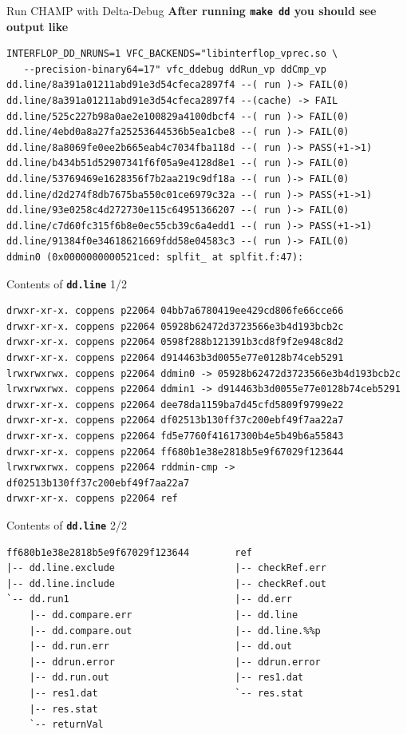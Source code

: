 \documentclass[aspectratio=169]{beamer}
\begin{document}
    \begin{frame}[fragile]{Run CHAMP with Delta-Debug}
    \textbf{After running \texttt{make dd} you should see output like}
      \begin{verbatim}
INTERFLOP_DD_NRUNS=1 VFC_BACKENDS="libinterflop_vprec.so \
   --precision-binary64=17" vfc_ddebug ddRun_vp ddCmp_vp
dd.line/8a391a01211abd91e3d54cfeca2897f4 --( run )-> FAIL(0)
dd.line/8a391a01211abd91e3d54cfeca2897f4 --(cache) -> FAIL
dd.line/525c227b98a0ae2e100829a4100dbcf4 --( run )-> FAIL(0)
dd.line/4ebd0a8a27fa25253644536b5ea1cbe8 --( run )-> FAIL(0)
dd.line/8a8069fe0ee2b665eab4c7034fba118d --( run )-> PASS(+1->1)
dd.line/b434b51d52907341f6f05a9e4128d8e1 --( run )-> FAIL(0)
dd.line/53769469e1628356f7b2aa219c9df18a --( run )-> FAIL(0)
dd.line/d2d274f8db7675ba550c01ce6979c32a --( run )-> PASS(+1->1)
dd.line/93e0258c4d272730e115c64951366207 --( run )-> FAIL(0)
dd.line/c7d60fc315f6b8e0ec55cb39c6a4edd1 --( run )-> PASS(+1->1)
dd.line/91384f0e34618621669fdd58e04583c3 --( run )-> FAIL(0)
ddmin0 (0x0000000000521ced: splfit_ at splfit.f:47):
      \end{verbatim}
    \end{frame}

    \begin{frame}[fragile ]{Contents of \textbf{\texttt{dd.line}} 1/2}
      \begin{verbatim}
drwxr-xr-x. coppens p22064 04bb7a6780419ee429cd806fe66cce66
drwxr-xr-x. coppens p22064 05928b62472d3723566e3b4d193bcb2c
drwxr-xr-x. coppens p22064 0598f288b121391b3cd8f9f2e948c8d2
drwxr-xr-x. coppens p22064 d914463b3d0055e77e0128b74ceb5291
lrwxrwxrwx. coppens p22064 ddmin0 -> 05928b62472d3723566e3b4d193bcb2c
lrwxrwxrwx. coppens p22064 ddmin1 -> d914463b3d0055e77e0128b74ceb5291
drwxr-xr-x. coppens p22064 dee78da1159ba7d45cfd5809f9799e22
drwxr-xr-x. coppens p22064 df02513b130ff37c200ebf49f7aa22a7
drwxr-xr-x. coppens p22064 fd5e7760f41617300b4e5b49b6a55843
drwxr-xr-x. coppens p22064 ff680b1e38e2818b5e9f67029f123644
lrwxrwxrwx. coppens p22064 rddmin-cmp -> df02513b130ff37c200ebf49f7aa22a7
drwxr-xr-x. coppens p22064 ref
      \end{verbatim}
    \end{frame}

    \begin{frame}[fragile ]{Contents of \textbf{\texttt{dd.line}} 2/2}
      \begin{verbatim}
ff680b1e38e2818b5e9f67029f123644        ref
|-- dd.line.exclude                     |-- checkRef.err
|-- dd.line.include                     |-- checkRef.out
`-- dd.run1                             |-- dd.err
    |-- dd.compare.err                  |-- dd.line
    |-- dd.compare.out                  |-- dd.line.%%p
    |-- dd.run.err                      |-- dd.out
    |-- ddrun.error                     |-- ddrun.error
    |-- dd.run.out                      |-- res1.dat
    |-- res1.dat                        `-- res.stat
    |-- res.stat
    `-- returnVal
      \end{verbatim}
    \end{frame}
    
\end{document}
